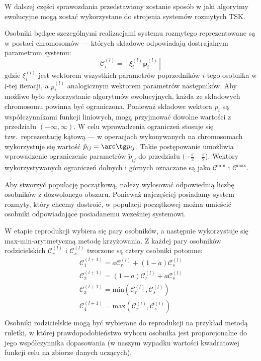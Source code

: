 \documentclass[a4paper,12pt,titlepage]{article}
\newcommand{\C}{\ensuremath{\mathcal{C}}}
\begin{document}
W dalszej części sprawozdania przedstawiony zostanie sposób w jaki algorytmy ewolucyjne mogą zostać wykorzystane do strojenia systemów rozmytych TSK.

Osobniki będące szczególnymi realizacjami systemu rozmytego reprezentowane są w postaci chromosomów --- których składowe odpowiadają dostrajalnym parametrom systemu:
\begin{equation}
\C _i^{(l)} = [\xi _i^{(l)} \mathbf{p}_i^{(l)}]
\end{equation}
gdzie $\xi _i^{(l)}$ jest wektorem wszystkich parametrów poprzedników $i$-tego osobnika w $l$-tej iteracji, a $p_i^{(l)}$ analogicznym wektorem parametrów następników. Aby możliwe było wykorzystanie algorytmów ewolucyjnych, każda ze składowych chromosomu powinna być ograniczona. Ponieważ składowe wektora $p_i$ są współczynnikami funkcji liniowych, mogą przyjmować dowolne wartości z przedziału $(-\infty , \infty)$. W celu wprowadzenia ograniczeń stosuje się tzw.\ reprezentację kątową --- w operacjach wykonywanych na chromosomach wykorzystuje się wartość $\tilde{p}_{ij} = \arc \tg p_{ij}$. Takie postępowanie umożliwia wprowadzenie ograniczenie parametrów $\tilde{p}_{ij}$ do przedziału $(-\frac{\pi}{2} \quad \frac{\pi}{2}$). Wektory  wykorzystywanych ograniczeń dolnych i górnych oznaczane są jako $\C ^{\mathrm{min}}$ i $\C ^{\mathrm{max}}$.

Aby stworzyć populację początkową, należy wylosować odpowiednią liczbę osobników z dozwolonego obszaru. Ponieważ najczęściej posiadamy system rozmyty, który chcemy dostroić, w populacji początkowej można umieścić osobniki odpowiadające posiadanemu wcześniej systemowi.

W etapie reprodukcji wybiera się pary osobników, a następnie wykorzystuje się max-min-arytmetyczną metodę krzyżowania. Z każdej pary osobników rodzicielskich $\C _r^{(l)}$ i $\C _s^{(l)}$ tworzone są cztery osobniki potomne:
\begin{equation}
\begin{array}{l}
\C _1^{(l+1)} = a\C _r^{(l)} + (1-a)\C _s^{(l)} \\
\C _2^{(l+1)} = (1-a)\C _r^{(l)} + a\C _s^{(l)} \\
\C _3^{(l+1)} = \mathrm{min}(\C _r^{(l)}, \C _s^{(l)}) \\
\C _4^{(l+1)} = \mathrm{max}(\C _r^{(l)}, \C _s^{(l)}) \\
\end{array}
\end{equation}
Osobniki rodzicielskie mogą być wybierane do reprodukcji na przykład metodą ruletki, w której prawdopodobieństwo wyboru osobnika jest proporcjonalne do jego współczynnika dopasowania (w naszym wypadku wartości kwadratowej funkcji celu na zbiorze danych uczących).
\end{document}
